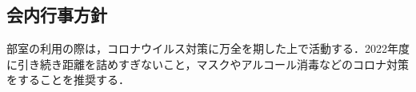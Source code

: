 \subsection*{会内行事方針}

部室の利用の際は，コロナウイルス対策に万全を期した上で活動する．2022年度に引き続き距離を詰めすぎないこと，マスクやアルコール消毒などのコロナ対策をすることを推奨する．


